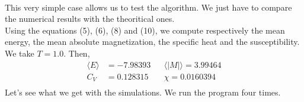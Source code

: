 \documentclass[a4paper, twoside, 11pt]{report}
\theoremstyle{theorem}
\theoremstyle{remark}
\theoremstyle{exemple}
\begin{document}
            \paragraph{}This very simple case allows us to test the algorithm. We just have to compare the numerical results with the theoritical ones.\\
            Using the equations (5), (6), (8) and (10), we compute respectively the mean energy, the mean absolute magnetization, the specific heat and the susceptibility. We take $T=1.0$.
            Then,
                \begin{align*}
                    \langle E \rangle &= -7.98393  
                    && \langle |M| \rangle = 3.99464 \\
                    C_V &= 0.128315
                    &&\chi = 0.0160394\\
                \end{align*}
            Let's see what we get with the simulations. We run the program four times. 
\end{document}
